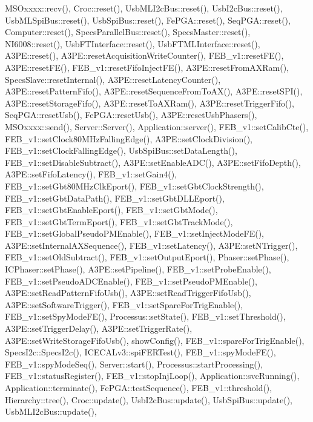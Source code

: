 M\+S\+Oxxxx\+::recv(), Croc\+::reset(), Usb\+M\+L\+I2c\+Bus\+::reset(), Usb\+I2c\+Bus\+::reset(), Usb\+M\+L\+Spi\+Bus\+::reset(), Usb\+Spi\+Bus\+::reset(), Fe\+P\+G\+A\+::reset(), Seq\+P\+G\+A\+::reset(), Computer\+::reset(), Specs\+Parallel\+Bus\+::reset(), Specs\+Master\+::reset(), N\+I6008\+::reset(), Usb\+F\+T\+Interface\+::reset(), Usb\+F\+T\+M\+L\+Interface\+::reset(), A3\+P\+E\+::reset(), A3\+P\+E\+::reset\+Acquisition\+Write\+Counter(), F\+E\+B\+\_\+v1\+::reset\+F\+E(), A3\+P\+E\+::reset\+F\+E(), F\+E\+B\+\_\+v1\+::reset\+Fifo\+Inject\+F\+E(), A3\+P\+E\+::reset\+From\+A\+X\+Ram(), Specs\+Slave\+::reset\+Internal(), A3\+P\+E\+::reset\+Latency\+Counter(), A3\+P\+E\+::reset\+Pattern\+Fifo(), A3\+P\+E\+::reset\+Sequence\+From\+To\+A\+X(), A3\+P\+E\+::reset\+S\+P\+I(), A3\+P\+E\+::reset\+Storage\+Fifo(), A3\+P\+E\+::reset\+To\+A\+X\+Ram(), A3\+P\+E\+::reset\+Trigger\+Fifo(), Seq\+P\+G\+A\+::reset\+Usb(), Fe\+P\+G\+A\+::reset\+Usb(), A3\+P\+E\+::reset\+Usb\+Phasers(), M\+S\+Oxxxx\+::send(), Server\+::\+Server(), Application\+::server(), F\+E\+B\+\_\+v1\+::set\+Calib\+Cte(), F\+E\+B\+\_\+v1\+::set\+Clock80\+M\+Hz\+Falling\+Edge(), A3\+P\+E\+::set\+Clock\+Division(), F\+E\+B\+\_\+v1\+::set\+Clock\+Falling\+Edge(), Usb\+Spi\+Bus\+::set\+Data\+Length(), F\+E\+B\+\_\+v1\+::set\+Disable\+Subtract(), A3\+P\+E\+::set\+Enable\+A\+D\+C(), A3\+P\+E\+::set\+Fifo\+Depth(), A3\+P\+E\+::set\+Fifo\+Latency(), F\+E\+B\+\_\+v1\+::set\+Gain4(), F\+E\+B\+\_\+v1\+::set\+Gbt80\+M\+Hz\+Clk\+Eport(), F\+E\+B\+\_\+v1\+::set\+Gbt\+Clock\+Strength(), F\+E\+B\+\_\+v1\+::set\+Gbt\+Data\+Path(), F\+E\+B\+\_\+v1\+::set\+Gbt\+D\+L\+L\+Eport(), F\+E\+B\+\_\+v1\+::set\+Gbt\+Enable\+Eport(), F\+E\+B\+\_\+v1\+::set\+Gbt\+Mode(), F\+E\+B\+\_\+v1\+::set\+Gbt\+Term\+Eport(), F\+E\+B\+\_\+v1\+::set\+Gbt\+Track\+Mode(), F\+E\+B\+\_\+v1\+::set\+Global\+Pseudo\+P\+M\+Enable(), F\+E\+B\+\_\+v1\+::set\+Inject\+Mode\+F\+E(), A3\+P\+E\+::set\+Internal\+A\+X\+Sequence(), F\+E\+B\+\_\+v1\+::set\+Latency(), A3\+P\+E\+::set\+N\+Trigger(), F\+E\+B\+\_\+v1\+::set\+Old\+Subtract(), F\+E\+B\+\_\+v1\+::set\+Output\+Eport(), Phaser\+::set\+Phase(), I\+C\+Phaser\+::set\+Phase(), A3\+P\+E\+::set\+Pipeline(), F\+E\+B\+\_\+v1\+::set\+Probe\+Enable(), F\+E\+B\+\_\+v1\+::set\+Pseudo\+A\+D\+C\+Enable(), F\+E\+B\+\_\+v1\+::set\+Pseudo\+P\+M\+Enable(), A3\+P\+E\+::set\+Read\+Pattern\+Fifo\+Usb(), A3\+P\+E\+::set\+Read\+Trigger\+Fifo\+Usb(), A3\+P\+E\+::set\+Software\+Trigger(), F\+E\+B\+\_\+v1\+::set\+Spare\+For\+Trig\+Enable(), F\+E\+B\+\_\+v1\+::set\+Spy\+Mode\+F\+E(), Processus\+::set\+State(), F\+E\+B\+\_\+v1\+::set\+Threshold(), A3\+P\+E\+::set\+Trigger\+Delay(), A3\+P\+E\+::set\+Trigger\+Rate(), A3\+P\+E\+::set\+Write\+Storage\+Fifo\+Usb(), show\+Config(), F\+E\+B\+\_\+v1\+::spare\+For\+Trig\+Enable(), Specs\+I2c\+::\+Specs\+I2c(), I\+C\+E\+C\+A\+Lv3\+::spi\+F\+E\+R\+Test(), F\+E\+B\+\_\+v1\+::spy\+Mode\+F\+E(), F\+E\+B\+\_\+v1\+::spy\+Mode\+Seq(), Server\+::start(), Processus\+::start\+Processing(), F\+E\+B\+\_\+v1\+::status\+Register(), F\+E\+B\+\_\+v1\+::stop\+Inj\+Loop(), Application\+::svc\+Running(), Application\+::terminate(), Fe\+P\+G\+A\+::test\+Sequence(), F\+E\+B\+\_\+v1\+::threshold(), Hierarchy\+::tree(), Croc\+::update(), Usb\+I2c\+Bus\+::update(), Usb\+Spi\+Bus\+::update(), Usb\+M\+L\+I2c\+Bus\+::update(), 